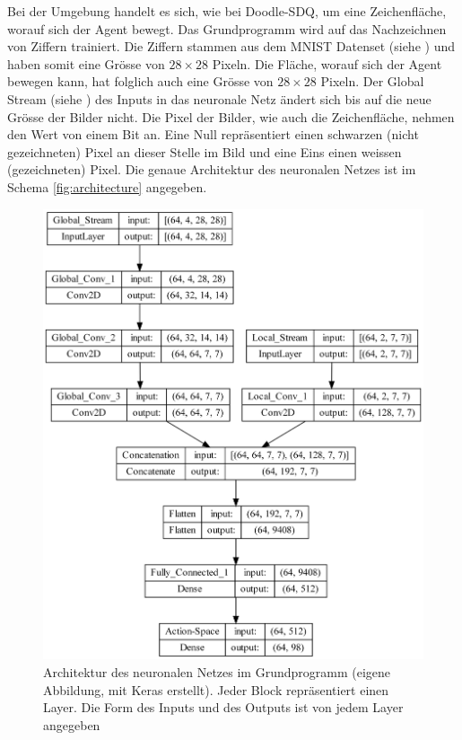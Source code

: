 Bei der Umgebung handelt es sich, wie bei Doodle-SDQ, um eine Zeichenfläche,
worauf sich der Agent bewegt. Das Grundprogramm wird auf das
Nachzeichnen von Ziffern trainiert. Die Ziffern stammen aus dem MNIST Datenset
(siehe ) und haben somit eine Grösse von $28\times28$
Pixeln. Die Fläche, worauf sich der Agent bewegen  
kann, hat folglich auch eine Grösse von $28\times28$ Pixeln. Der Global Stream
(siehe ) des Inputs in das neuronale Netz ändert sich
bis auf die neue Grösse der Bilder nicht. Die Pixel der Bilder, wie auch die
Zeichenfläche, nehmen den Wert von einem Bit an. Eine Null repräsentiert einen
schwarzen (nicht gezeichneten) Pixel an dieser Stelle im Bild und eine Eins
einen weissen (gezeichneten) Pixel. Die genaue Architektur des neuronalen Netzes
ist im Schema \autoref{fig:architecture} angegeben.
 
\begin{figure}[!ht]
 \centering
 \includegraphics[width=\textwidth-2cm]{images/methode/architecture.png}
 \caption{Architektur des neuronalen Netzes im Grundprogramm (eigene Abbildung, mit Keras erstellt). Jeder Block repräsentiert einen Layer. Die Form des Inputs und des Outputs ist von jedem Layer angegeben}\label{fig:architecture}
\end{figure}
 
